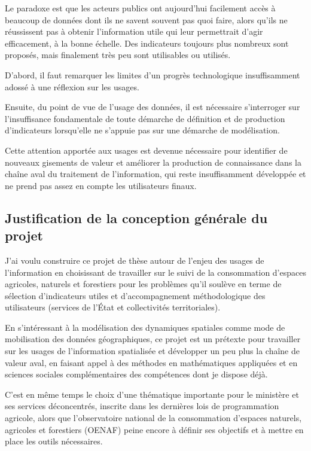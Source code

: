 Le paradoxe est que les acteurs publics ont aujourd'hui facilement accès à
beaucoup de données dont ils ne savent souvent pas quoi faire, alors qu'ils ne
réussissent pas à obtenir l'information utile qui leur permettrait d'agir
efficacement, à la bonne échelle. Des indicateurs toujours plus nombreux
sont proposés, mais finalement très peu sont utilisables ou utilisés.


D'abord, il faut remarquer les limites d'un progrès
technologique insuffisamment adossé à une réflexion sur les usages.

Ensuite, du point de vue de l'usage des données,
il est nécessaire s'interroger sur l'insuffisance fondamentale
de toute démarche de définition et de production
d'indicateurs lorsqu'elle ne s'appuie pas sur une démarche
de modélisation.

Cette attention apportée aux usages est devenue nécessaire pour identifier de
nouveaux gisements de valeur et améliorer la production de connaissance
dans la chaîne aval du traitement de l'information, qui reste
insuffisamment développée et ne prend pas assez en compte les utilisateurs
finaux.

\stopitemize


\subsection
{Justification de la conception générale du projet}

J'ai voulu construire ce projet de thèse autour de
l'enjeu des usages de l'information en choisissant de
travailler sur le suivi de la consommation d'espaces agricoles,
naturels et forestiers pour les problèmes qu'il soulève en terme
de sélection d'indicateurs utiles et d'accompagnement méthodologique des utilisateurs
(services de l'État et collectivités territoriales).

En s'intéressant à la modélisation des dynamiques spatiales comme mode de
mobilisation des données géographiques, ce projet est un prétexte pour
travailler sur les usages de l'information spatialisée et développer un peu
plus la chaîne de valeur aval, en faisant appel à des méthodes en
mathématiques appliquées et en sciences sociales complémentaires des
compétences dont je dispose déjà.

C'est en même temps le choix d'une thématique importante pour le ministère et
ses services déconcentrés, inscrite dans les dernières lois de programmation
agricole, alors que l'observatoire national de la consommation d'espaces
naturels, agricoles et forestiers (OENAF) peine encore à définir ses
objectifs et à mettre en place les outils nécessaires.